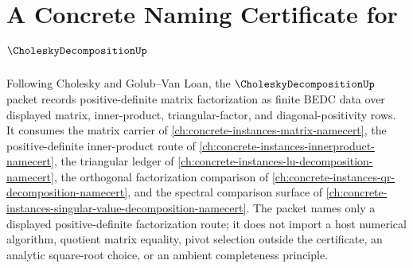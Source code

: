 \chapter{A Concrete Naming Certificate for $\CholeskyDecompositionUp$}
\label{ch:concrete-instances-cholesky-decomposition-namecert}

Following Cholesky and Golub--Van Loan, the $\CholeskyDecompositionUp$ packet records positive-definite matrix factorization as finite BEDC data over displayed matrix, inner-product, triangular-factor, and diagonal-positivity rows. It consumes the matrix carrier of \autoref{ch:concrete-instances-matrix-namecert}, the positive-definite inner-product route of \autoref{ch:concrete-instances-innerproduct-namecert}, the triangular ledger of \autoref{ch:concrete-instances-lu-decomposition-namecert}, the orthogonal factorization comparison of \autoref{ch:concrete-instances-qr-decomposition-namecert}, and the spectral comparison surface of \autoref{ch:concrete-instances-singular-value-decomposition-namecert}. The packet names only a displayed positive-definite factorization route; it does not import a host numerical algorithm, quotient matrix equality, pivot selection outside the certificate, an analytic square-root choice, or an ambient completeness principle.

